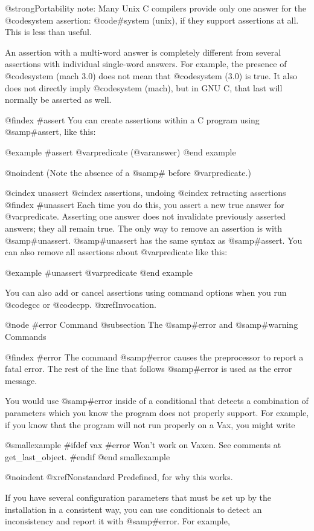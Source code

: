 {{@strong{Portability note:} Many Unix C compilers provide only one answer
for the @code{system} assertion: @code{#system (unix)}, if they support
assertions at all.  This is less than useful.

An assertion with a multi-word answer is completely different from several
assertions with individual single-word answers.  For example, the presence
of @code{system (mach 3.0)} does not mean that @code{system (3.0)} is true.
It also does not directly imply @code{system (mach)}, but in GNU C, that
last will normally be asserted as well.

@findex #assert
You can create assertions within a C program using @samp{#assert}, like
this:

@example
#assert @var{predicate} (@var{answer})
@end example

@noindent
(Note the absence of a @samp{#} before @var{predicate}.)

@cindex unassert
@cindex assertions, undoing
@cindex retracting assertions
@findex #unassert
Each time you do this, you assert a new true answer for @var{predicate}.
Asserting one answer does not invalidate previously asserted answers;
they all remain true.  The only way to remove an assertion is with
@samp{#unassert}.  @samp{#unassert} has the same syntax as
@samp{#assert}.  You can also remove all assertions about
@var{predicate} like this:

@example
#unassert @var{predicate}
@end example

You can also add or cancel assertions using command options
when you run @code{gcc} or @code{cpp}.  @xref{Invocation}.

@node #error Command
@subsection The @samp{#error} and @samp{#warning} Commands

@findex #error
The command @samp{#error} causes the preprocessor to report a fatal
error.  The rest of the line that follows @samp{#error} is used as the
error message.

You would use @samp{#error} inside of a conditional that detects a
combination of parameters which you know the program does not properly
support.  For example, if you know that the program will not run
properly on a Vax, you might write

@smallexample
#ifdef vax
#error Won't work on Vaxen.  See comments at get_last_object.
#endif
@end smallexample

@noindent
@xref{Nonstandard Predefined}, for why this works.

If you have several configuration parameters that must be set up by
the installation in a consistent way, you can use conditionals to detect
an inconsistency and report it with @samp{#error}.  For example,

}}
